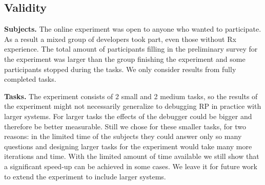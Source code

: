 \subsection{Validity}
\textbf{Subjects.} The online experiment was open to anyone who wanted to participate. As a result a mixed group of developers took part, even those without Rx experience. The total amount of participants filling in the preliminary survey for the experiment was larger than the group finishing the experiment and some participants stopped during the tasks. We only consider results from fully completed tasks.

\textbf{Tasks.} The experiment consists of 2 small and 2 medium tasks, so the results of the experiment might not necessarily generalize to debugging RP in practice with larger systems. For larger tasks the effects of the debugger could be bigger and therefore be better measurable. Still we chose for these smaller tasks, for two reasons: in the limited time of the subjects they could answer only so many questions and designing larger tasks for the experiment would take many more iterations and time. With the limited amount of time available we still show that a significant speed-up can be achieved in some cases. We leave it for future work to extend the experiment to include larger systems.
